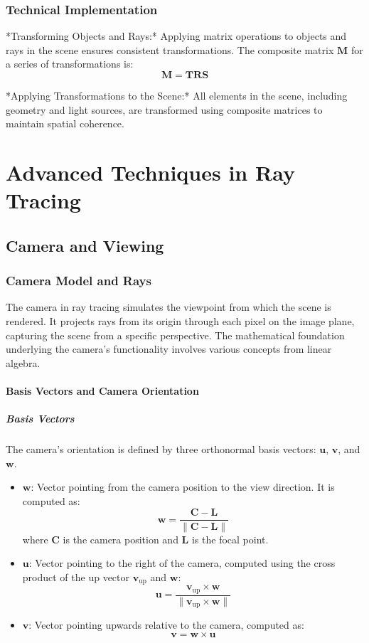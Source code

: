 \documentclass[12pt]{article}
\begin{document}
\subsubsection{Technical Implementation}
*Transforming Objects and Rays:* Applying matrix operations to objects and rays in the scene ensures consistent transformations. The composite matrix \(\mathbf{M}\) for a series of transformations is:
\[
    \mathbf{M} = \mathbf{T} \mathbf{R} \mathbf{S}
\]

*Applying Transformations to the Scene:* All elements in the scene, including geometry and light sources, are transformed using composite matrices to maintain spatial coherence.




\section{Advanced Techniques in Ray Tracing}
\label{sec:advanced}

\subsection{Camera and Viewing}
\label{subsec:camera-viewing}

\subsubsection{Camera Model and Rays}
The camera in ray tracing simulates the viewpoint from which the scene is rendered. It projects rays from its origin through each pixel on the image plane, capturing the scene from a specific perspective. The mathematical foundation underlying the camera's functionality involves various concepts from linear algebra.

\paragraph{Basis Vectors and Camera Orientation}

\subparagraph{Basis Vectors}
The camera's orientation is defined by three orthonormal basis vectors: \(\mathbf{u}\), \(\mathbf{v}\), and \(\mathbf{w}\).
\begin{itemize}
    \item \(\mathbf{w}\): Vector pointing from the camera position to the view direction. It is computed as:
          \[
              \mathbf{w} = \frac{\mathbf{C} - \mathbf{L}}{\|\mathbf{C} - \mathbf{L}\|}
          \]
          where \(\mathbf{C}\) is the camera position and \(\mathbf{L}\) is the focal point.
    \item \(\mathbf{u}\): Vector pointing to the right of the camera, computed using the cross product of the up vector \(\mathbf{v}_{\text{up}}\) and \(\mathbf{w}\):
          \[
              \mathbf{u} = \frac{\mathbf{v}_{\text{up}} \times \mathbf{w}}{\|\mathbf{v}_{\text{up}} \times \mathbf{w}\|}
          \]
    \item \(\mathbf{v}\): Vector pointing upwards relative to the camera, computed as:
          \[
              \mathbf{v} = \mathbf{w} \times \mathbf{u}
          \]
\end{itemize}
\end{document}
